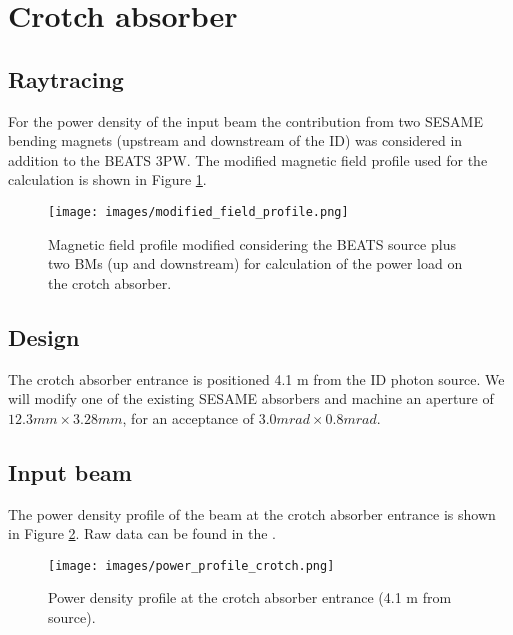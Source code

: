 \section{Crotch absorber}
\subsection{Raytracing}
For the power density of the input beam the contribution from two SESAME bending magnets (upstream and downstream of the ID) was considered in addition to the BEATS 3PW. The modified magnetic field profile used for the calculation is shown in Figure \ref{fig:modifiedfieldprofile}. \\
\begin{figure}[ht]
\centering
\texttt{[image: images/modified\_field\_profile.png]}
\caption{\label{fig:modifiedfieldprofile} Magnetic field profile modified considering the BEATS source plus two BMs (up and downstream) for calculation of the power load on the crotch absorber.}
\end{figure}

\subsection{Design}
The crotch absorber entrance is positioned 4.1 m from the ID photon source. We will modify one of the existing SESAME absorbers and machine an aperture of $12.3mm \times 3.28 mm$, for an acceptance of $3.0 mrad \times 0.8  mrad$. 

\subsection{Input beam}
The power density profile of the beam at the crotch absorber entrance is shown in Figure \ref{fig:power_profile_crotch}. Raw data can be found in the \powerprofilesurl. \\
\begin{figure}[ht]
\centering
\texttt{[image: images/power\_profile\_crotch.png]}
\caption{\label{fig:power_profile_crotch} Power density profile at the crotch absorber entrance (4.1 m from source).}
\end{figure}